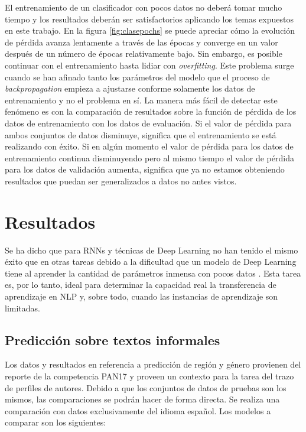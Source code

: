 El entrenamiento de un clasificador con pocos datos no deberá tomar mucho tiempo y los resultados deberán ser satisfactorios aplicando los temas expuestos en este trabajo. En la figura \ref{fig:clasepochs} se puede apreciar cómo la evolución de pérdida avanza lentamente a través de las épocas y converge en un valor después de un número de épocas relativamente bajo. Sin embargo, es posible continuar con el entrenamiento hasta lidiar con \textit{overfitting}. Este problema surge cuando se han afinado tanto los parámetros del modelo que el proceso de \textit{backpropagation} empieza a ajustarse conforme solamente los datos de entrenamiento y no el problema en sí. La manera más fácil de detectar este fenómeno es con la comparación de resultados sobre la función de pérdida de los datos de entrenamiento con los datos de evaluación. Si el valor de pérdida para ambos conjuntos de datos disminuye, significa que el entrenamiento se está realizando con éxito. Si en algún momento el valor de pérdida para los datos de entrenamiento continua disminuyendo pero al mismo tiempo el valor de pérdida para los datos de validación aumenta, significa que ya no estamos obteniendo resultados que puedan ser generalizados a datos no antes vistos.

\section{Resultados}

Se ha dicho que para RNNs y técnicas de Deep Learning no han tenido el mismo éxito que en otras tareas debido a la dificultad que un modelo de Deep Learning tiene al aprender la cantidad de parámetros inmensa con pocos datos \parencite{zampieri2017, malmasi2016discriminating}. Esta tarea es, por lo tanto, ideal para determinar la capacidad real la transferencia de aprendizaje en NLP y, sobre todo, cuando las instancias de aprendizaje son limitadas.

\subsection{Predicción sobre textos informales}

Los datos y resultados en referencia a predicción de región y género provienen del reporte de la competencia PAN17 \parencite{rangel2017overview} y proveen un contexto para la tarea del trazo de perfiles de autores. Debido a que los conjuntos de datos de pruebas son los mismos, las comparaciones se podrán hacer de forma directa. Se realiza una comparación con datos exclusivamente del idioma español. Los modelos a comparar son los siguientes:

